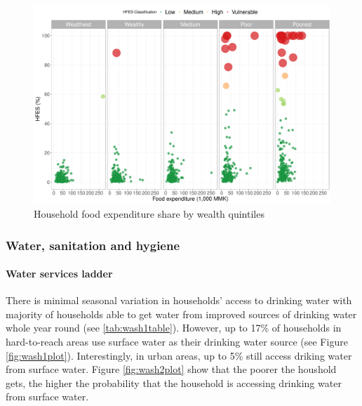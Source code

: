 \documentclass[12pt,a4paper]{article}
\let\oldparagraph\paragraph
\renewcommand{\paragraph}[1]{\oldparagraph{#1}\mbox{}}
\begin{document}
\begin{figure}[H]

{\centering \includegraphics{kayahReport_files/figure-latex/hfesScatterPlot2-1} 

}

\caption{Household food expenditure share by wealth quintiles}\label{fig:hfesScatterPlot2}
\end{figure}

\hypertarget{wash-results}{%
\subsubsection{Water, sanitation and hygiene}\label{wash-results}}

\hypertarget{water-results}{%
\paragraph{Water services ladder}\label{water-results}}

There is minimal seasonal variation in households' access to drinking water with majority of households able to get water from improved sources of drinking water whole year round (see \ref{tab:wash1table}). However, up to 17\% of households in hard-to-reach areas use surface water as their drinking water source (see Figure \ref{fig:wash1plot}). Interestingly, in urban areas, up to 5\% still access driking water from surface water. Figure \ref{fig:wash2plot} show that the poorer the houshold gets, the higher the probability that the household is accessing drinking water from surface water.
\end{document}
